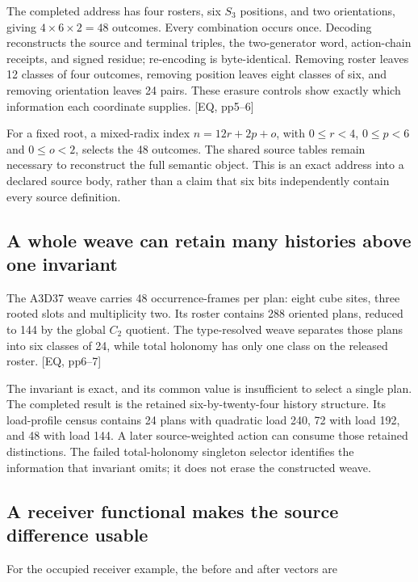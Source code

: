 The completed address has four rosters, six \(S_3\) positions, and two orientations, giving \(4\times6\times2=48\) outcomes. Every combination occurs once. Decoding reconstructs the source and terminal triples, the two-generator word, action-chain receipts, and signed residue; re-encoding is byte-identical. Removing roster leaves 12 classes of four outcomes, removing position leaves eight classes of six, and removing orientation leaves 24 pairs. These erasure controls show exactly which information each coordinate supplies. {[}EQ, pp5--6{]}

For a fixed root, a mixed-radix index \(n=12r+2p+o\), with \(0\le r<4\), \(0\le p<6\) and \(0\le o<2\), selects the 48 outcomes. The shared source tables remain necessary to reconstruct the full semantic object. This is an exact address into a declared source body, rather than a claim that six bits independently contain every source definition.

\subsection{A whole weave can retain many histories above one invariant}\label{a-whole-weave-can-retain-many-histories-above-one-invariant}

The A3D37 weave carries 48 occurrence-frames per plan: eight cube sites, three rooted slots and multiplicity two. Its roster contains 288 oriented plans, reduced to 144 by the global \(C_2\) quotient. The type-resolved weave separates those plans into six classes of 24, while total holonomy has only one class on the released roster. {[}EQ, pp6--7{]}

The invariant is exact, and its common value is insufficient to select a single plan. The completed result is the retained six-by-twenty-four history structure. Its load-profile census contains 24 plans with quadratic load 240, 72 with load 192, and 48 with load 144. A later source-weighted action can consume those retained distinctions. The failed total-holonomy singleton selector identifies the information that invariant omits; it does not erase the constructed weave.

\subsection{A receiver functional makes the source difference usable}\label{a-receiver-functional-makes-the-source-difference-usable}

For the occupied receiver example, the before and after vectors are

